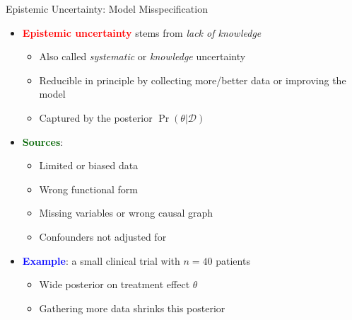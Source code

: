 \documentclass[
  10pt,
  ignorenonframetext,
]{beamer}
\providecommand{\tightlist}{%
  \setlength{\itemsep}{0pt}\setlength{\parskip}{0pt}}
\begin{document}
\begin{frame}{Epistemic Uncertainty: Model Misspecification}
\label{epistemic-uncertainty-model-misspecification}
\begin{itemize}
\tightlist
\item
  \textbf{\textcolor{red}{Epistemic uncertainty}} stems from \emph{lack
  of knowledge}

  \begin{itemize}
  \tightlist
  \item
    Also called \emph{systematic} or \emph{knowledge} uncertainty
  \item
    Reducible in principle by collecting more/better data or improving
    the model
  \item
    Captured by the posterior \(\Pr(\theta | \mathcal{D})\)
  \end{itemize}
\item
  \textbf{\textcolor{darkgreen}{Sources}}:

  \begin{itemize}
  \tightlist
  \item
    Limited or biased data
  \item
    Wrong functional form
  \item
    Missing variables or wrong causal graph
  \item
    Confounders not adjusted for
  \end{itemize}
\item
  \textbf{\textcolor{blue}{Example}}: a small clinical trial with
  \(n = 40\) patients

  \begin{itemize}
  \tightlist
  \item
    Wide posterior on treatment effect \(\theta\)
  \item
    Gathering more data shrinks this posterior
  \end{itemize}
\end{itemize}
\end{frame}
\end{document}
